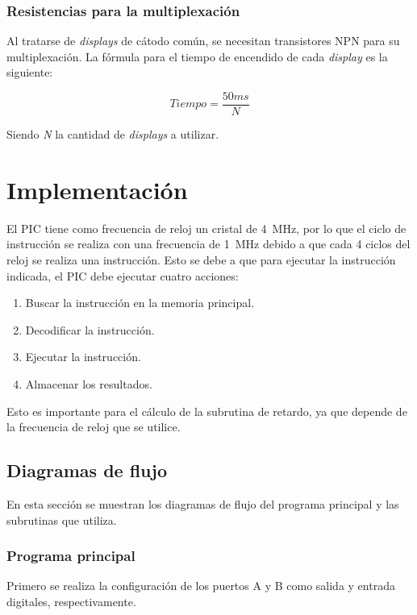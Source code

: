 \documentclass[12pt,a4paper]{article}
\begin{document}
\subsubsection{Resistencias para la multiplexación}	
	Al tratarse de \emph{displays} de cátodo común, se necesitan transistores NPN para su multiplexación.
	La fórmula para el tiempo de encendido de cada \emph{display} es la siguiente:
	
	\begin{equation}
	Tiempo = \frac{50ms}{N}
	\end{equation}
	
	 Siendo \emph{N} la cantidad de \emph{displays} a utilizar.
	 
\section{Implementación}
	El PIC tiene como frecuencia de reloj un cristal de \SI{4}{\MHz}, por lo que el ciclo de instrucción se realiza con una frecuencia de \SI{1}{\MHz} debido a que cada 4 ciclos del reloj se realiza una instrucción. Esto se debe a que para ejecutar la instrucción indicada, el PIC debe ejecutar cuatro acciones: 
	
	\begin{enumerate}[leftmargin=1.5cm,nosep]
	\item Buscar la instrucción en la memoria principal.
	\item Decodificar la instrucción.
	\item Ejecutar la instrucción.
	\item Almacenar los resultados.
	\end{enumerate}
	
	Esto es importante para el cálculo de la subrutina de retardo, ya que depende de la frecuencia de reloj que se utilice.

	
\subsection{Diagramas de flujo}
	En esta sección se muestran los diagramas de flujo del programa principal y las subrutinas que utiliza.
	
	\subsubsection{Programa principal}	
	Primero se realiza la configuración de los puertos A y B como salida y entrada digitales, respectivamente. 
	
\end{document}

